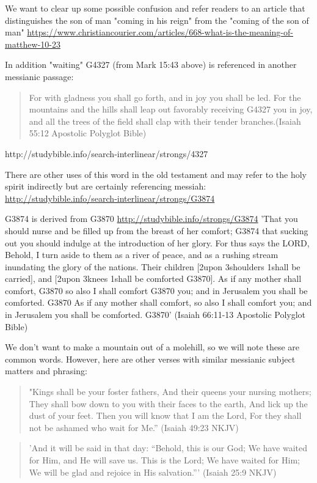 \documentclass[11pt]{article}
\begin{document}
We want to clear up some possible confusion and refer readers to an article that distinguishes the son of man "coming in his reign" from the "coming of the son of man" \url{https://www.christiancourier.com/articles/668-what-is-the-meaning-of-matthew-10-23}

In addition "waiting" G4327 (from Mark 15:43 above) is referenced in another messianic passage:

\begin{quote}
For with gladness you shall go forth, and in joy you shall be led. For the mountains and the hills shall leap out favorably receiving G4327 you in joy, and all the trees of the field shall clap with their tender branches.(Isaiah 55:12 Apostolic Polyglot Bible) 
\end{quote}
http://studybible.info/search-interlinear/strongs/4327

There are other uses of this word in the old testament and may refer to the holy spirit indirectly but are certainly referencing messiah:
\url{http://studybible.info/search-interlinear/strongs/G3874}

G3874 is derived from G3870
\url{http://studybible.info/strongs/G3874}
'That you should nurse and be filled up from the breast of her comfort; G3874 that sucking out you should indulge at the introduction of her glory. For thus says the LORD, Behold, I turn aside to them as a river of peace, and as a rushing stream inundating the glory of the nations. Their children [2upon 3shoulders 1shall be carried], and [2upon 3knees 1shall be comforted G3870]. As if any mother shall comfort, G3870 so also I shall comfort G3870 you; and in Jerusalem you shall be comforted. G3870 As if any mother shall comfort, so also I shall comfort you; and in Jerusalem you shall be comforted. G3870'
(Isaiah 66:11-13 Apostolic Polyglot Bible)\newline

We don't want to make a mountain out of a molehill, so we will note these are common words. However, here are other verses with similar messianic subject matters and phrasing: 
\begin{quote}
"Kings shall be your foster fathers,
And their queens your nursing mothers;
They shall bow down to you with their faces to the earth,
And lick up the dust of your feet.
Then you will know that I am the Lord,
For they shall not be ashamed who wait for Me.”
(Isaiah 49:23 NKJV)
\end{quote}

\begin{quote}
'And it will be said in that day:
“Behold, this is our God;
We have waited for Him, and He will save us.
This is the Lord;
We have waited for Him;
We will be glad and rejoice in His salvation.”'
(Isaiah 25:9 NKJV)
\end{quote}
\end{document}
